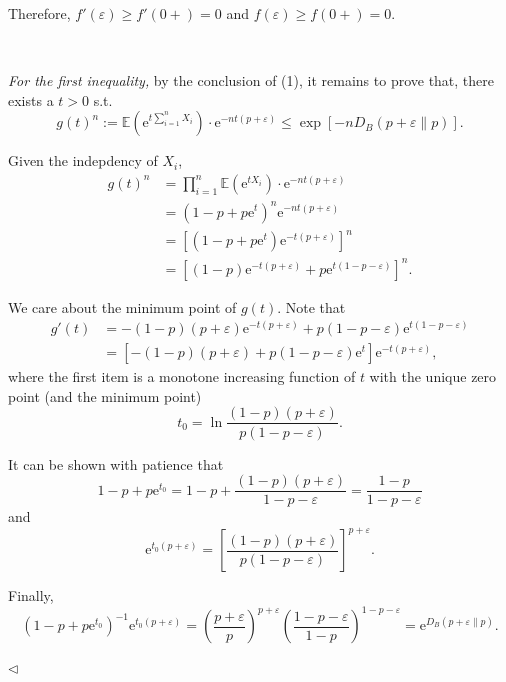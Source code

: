 ﻿\documentclass[11pt]{article}
\newenvironment{answer}[1][Answer]{\begin{trivlist}
\item[\hskip \labelsep {\bfseries #1.}\hskip \labelsep]}{\hfill$\lhd$\end{trivlist}}
\begin{document}
\begin{answer}
\begin{itemize}
        Therefore, $f'(\varepsilon)\ge f'(0+)=0$ and $f(\varepsilon)\ge f(0+)=0$.

        \,

        \textit{For the first inequality,} by the conclusion of (1), it remains to prove that,
        there exists a $t>0$ s.t.
        $$
            g(t)^n:=\mathbb{E}\left(\mathrm{e}^{t\sum_{i=1}^{n}X_i}\right)\cdot\mathrm{e}^{-nt(p+\varepsilon)}\le\exp\left[-nD_B(p+\varepsilon\parallel p)\right].
        $$

        Given the indepdency of $X_i$,
        $$
            \begin{aligned}
                g(t)^n &= \prod_{i=1}^n\mathbb{E}\left(\mathrm{e}^{tX_i}\right)\cdot\mathrm{e}^{-nt(p+\varepsilon)}\\
                &= (1-p+p\mathrm{e}^{t})^n\mathrm{e}^{-nt(p+\varepsilon)}\\
                &= \left[(1-p+p\mathrm{e}^t)\mathrm{e}^{-t(p+\varepsilon)}\right]^n\\
                &= \left[(1-p)\mathrm{e}^{-t(p+\varepsilon)}+p\mathrm{e}^{t(1-p-\varepsilon)}\right]^n.
            \end{aligned}
        $$

        We care about the minimum point of $g(t)$. Note that
        $$
            \begin{aligned}
                g'(t) &= -(1-p)(p+\varepsilon)\mathrm{e}^{-t(p+\varepsilon)}+p(1-p-\varepsilon)\mathrm{e}^{t(1-p-\varepsilon)}\\
                &= \left[-(1-p)(p+\varepsilon)+p(1-p-\varepsilon)\mathrm{e}^t\right]\mathrm{e}^{-t(p+\varepsilon)},
            \end{aligned}
        $$
        where the first item is a monotone increasing function of $t$ with the unique zero point (and  the minimum point)
        $$
            t_0=\ln\frac{(1-p)(p+\varepsilon)}{p(1-p-\varepsilon)}.
        $$

        It can be shown with patience that
        $$
            1-p+p\mathrm{e}^{t_0}=1-p+\frac{(1-p)(p+\varepsilon)}{1-p-\varepsilon}=\frac{1-p}{1-p-\varepsilon}
        $$
        and
        $$
            \mathrm{e}^{t_0(p+\varepsilon)}=\left[\frac{(1-p)(p+\varepsilon)}{p(1-p-\varepsilon)}\right]^{p+\varepsilon}.
        $$

        Finally,
        $$
            (1-p+p\mathrm{e}^{t_0})^{-1}\mathrm{e}^{t_0(p+\varepsilon)}=\left(\frac{p+\varepsilon}{p}\right)^{p+\varepsilon}\left(\frac{1-p-\varepsilon}{1-p}\right)^{1-p-\varepsilon}=\mathrm{e}^{D_B(p+\varepsilon\parallel p)}.
        $$
\end{itemize}
\end{answer}
\end{document}
